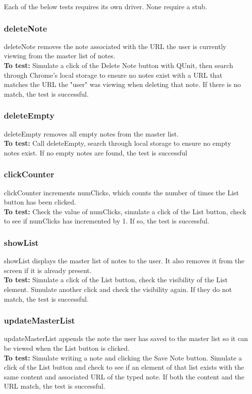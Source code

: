 \documentclass[12pt, titlepage]{article}
\begin{document}
Each of the below tests requires its own driver. None require a stub.

\subsubsection{deleteNote}
	deleteNote removes the note associated with the URL the user is currently 
	viewing from the master list of notes.\\
	\textbf{To test:} Simulate a click of the Delete Note button with QUnit, 
	then search through Chrome's local storage to ensure no notes exist with a 
	URL that matches the URL the "user" was viewing when deleting that note. If 
	there is no match, the test is successful.
\subsubsection{deleteEmpty}
	deleteEmpty removes all empty notes from the master list.\\
	\textbf{To test:} Call deleteEmpty, search through local storage to ensure 
	no empty notes exist. If no empty notes are found, the test is successful
\subsubsection{clickCounter}
	clickCounter increments numClicks, which counts the number of times the 
	List button has been clicked.\\
	\textbf{To test:} Check the value of numClicks, simulate a click of the 
	List button, 
	check to see if numClicks has incremented by 1. If so, the test is 
	successful.
\subsubsection{showList}
	showList displays the master list of notes to the user. It also removes it 
	from the screen if it is already present.\\
	\textbf{To test:} Simulate a click of the List button, check the visibility 
	of the 
	List element. Simulate another click and check the visibility again. If 
	they do not match, the test is successful.
\subsubsection{updateMasterList}
	updateMasterList appends the note the user has saved to the master list so 
	it can be viewed when the List button is clicked.\\
	\textbf{To test:} Simulate writing a note and clicking the Save Note 
	button. 
	Simulate a click of the List button and check to see if an element of that 
	list exists with the same content and associated URL of the typed note. If 
	both the content and the URL match, the test is successful.
\end{document}
